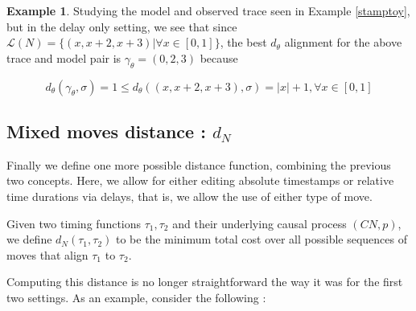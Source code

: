 \documentclass{article}
\theoremstyle{Definition}
\theoremstyle{definition}
\newtheorem{example}{Example}
\begin{document}
	\begin{example}
		Studying the model and observed trace seen in Example \ref{stamptoy}, but in the delay only setting, we see that since $\mathcal{L}(N) = \{ (x, x+2, x+3) | \forall x \in [0, 1] \}$, the best $d_\theta$ alignment for the above trace and model pair is $\gamma_\theta = (0,2,3)$ because
		
		$$d_\theta(\gamma_\theta, \sigma) = 1 \leq d_\theta((x, x+2, x+3), \sigma) = |x| + 1, \forall x \in [0, 1]$$
	\end{example}
	
	
	\subsection{Mixed moves distance : $d_N$}
	
		Finally we define one more possible distance function, combining the previous two concepts. 
		Here, we allow for either editing absolute timestamps or relative time durations via delays, that is, we allow the use of either type of move. 
	
	Given two timing functions $\tau_1, \tau_2$ and their underlying causal process $(CN, p)$, we define $d_N(\tau_1, \tau_2)$ to be the minimum total cost over all possible sequences of moves that align $\tau_1$ to $\tau_2$. 
	
	Computing this distance is no longer straightforward the way it was for the first two settings. 
	As an example, consider the following : 
\end{document}
